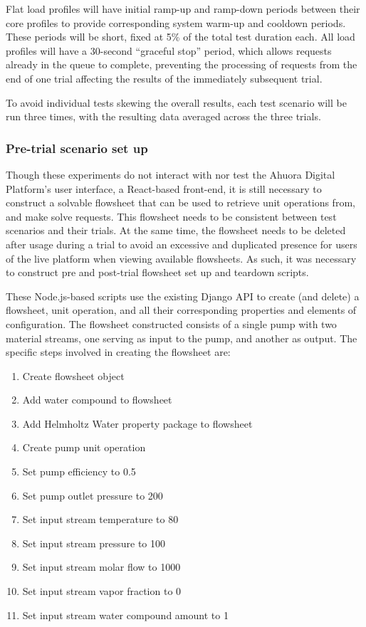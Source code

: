 
Flat load profiles will have initial ramp-up and ramp-down periods between their core profiles to provide corresponding system warm-up and cooldown periods. These periods will be short, fixed at 5\% of the total test duration each. All load profiles will have a 30-second ``graceful stop'' period, which allows requests already in the queue to complete, preventing the processing of requests from the end of one trial affecting the results of the immediately subsequent trial.

To avoid individual tests skewing the overall results, each test scenario will be run three times, with the resulting data averaged across the three trials.

\subsubsection{Pre-trial scenario set up}

Though these experiments do not interact with nor test the Ahuora Digital Platform's user interface, a React-based front-end, it is still necessary to construct a solvable flowsheet that can be used to retrieve unit operations from, and make solve requests. This flowsheet needs to be consistent between test scenarios and their trials. At the same time, the flowsheet needs to be deleted after usage during a trial to avoid an excessive and duplicated presence for users of the live platform when viewing available flowsheets. As such, it was necessary to construct pre and post-trial flowsheet set up and teardown scripts.

These Node.js-based scripts use the existing Django API to create (and delete) a flowsheet, unit operation, and all their corresponding properties and elements of configuration. The flowsheet constructed consists of a single pump with two material streams, one serving as input to the pump, and another as output. The specific steps involved in creating the flowsheet are:

\begin{enumerate}[itemsep=0pt]
    \item Create flowsheet object
    \item Add water compound to flowsheet
    \item Add Helmholtz Water property package to flowsheet
    \item Create pump unit operation
    \item Set pump efficiency to 0.5
    \item Set pump outlet pressure to 200
    \item Set input stream temperature to 80
    \item Set input stream pressure to 100
    \item Set input stream molar flow to 1000
    \item Set input stream vapor fraction to 0
    \item Set input stream water compound amount to 1
\end{enumerate}

